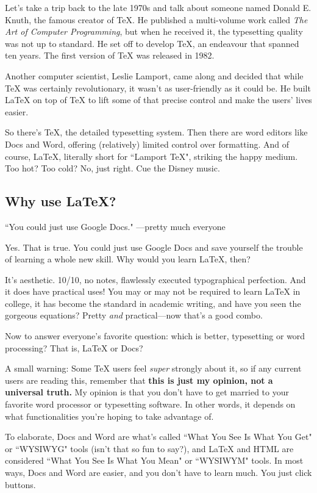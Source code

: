 \documentclass[letterpaper, 12pt]{article}
\begin{document}
Let's take a trip back to the late 1970s and talk about someone named Donald E. Knuth, the famous creator of \TeX{}. He published a multi-volume work called \textit{The Art of Computer Programming}, but when he received it, the typesetting quality was not up to standard. He set off to develop \TeX{}, an endeavour that spanned ten years. The first version of \TeX{} was released in 1982.

Another computer scientist, Leslie Lamport, came along and decided that while \TeX{} was certainly revolutionary, it wasn't as user-friendly as it could be. He built \LaTeX{} on top of \TeX{} to lift some of that precise control and make the users' lives easier.

So there's \TeX, the detailed typesetting system. Then there are word editors like Docs and Word, offering (relatively) limited control over formatting. And of course, \LaTeX, literally short for ``Lamport \TeX", striking the happy medium. Too hot? Too cold? No, just right. Cue the Disney music.

\subsection{Why use \LaTeX?}
``You could just use Google Docs." ---pretty much everyone

Yes. That is true. You could just use Google Docs and save yourself the trouble of learning a whole new skill. Why would you learn \LaTeX{}, then?

It's aesthetic. 10/10, no notes, flawlessly executed typographical perfection. And it does have practical uses! You may or may not be required to learn \LaTeX{} in college, it has become the standard in academic writing, and have you seen the gorgeous equations? Pretty \textit{and} practical---now that's a good combo.

Now to answer everyone's favorite question: which is better, typesetting or word processing? That is, \LaTeX{} or Docs?

A small warning: Some \TeX{} users feel \textit{super} strongly about it, so if any current users are reading this, remember that \textbf{this is just my opinion, not a universal truth.} My opinion is that you don't have to get married to your favorite word processor or typesetting software. In other words, it depends on what functionalities you're hoping to take advantage of.

To elaborate, Docs and Word are what's called ``What You See Is What You Get" or ``WYSIWYG" tools (isn't that so fun to say?), and \LaTeX{} and HTML are considered ``What You See Is What You Mean" or ``WYSIWYM" tools. In most ways, Docs and Word are easier, and you don't have to learn much. You just click buttons.
\end{document}
